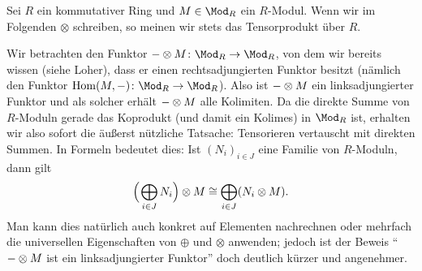 \begin{thBeispiel}
    \label{ch3:bsp:tensorvskolimiten}
    \newcommand{\tensorM}{\blank\otimes M}
    Sei $R$ ein kommutativer Ring und $M\in\Mod_R$ ein $R$-Modul. Wenn wir im
    Folgenden $\otimes$ schreiben, so meinen wir stets das Tensorprodukt über
    $R$. 
    
    \noindent
    Wir betrachten den Funktor $\tensorM\colon\Mod_R\to\Mod_R$, von dem wir
    bereits wissen (siehe Loher\cite[2.8]{talk:loher}), dass er einen
    rechtsadjungierten Funktor besitzt (nämlich den Funktor
    $\operatorname{Hom}(M,\blank)\colon \Mod_R\to\Mod_R$). Also ist $\tensorM$
    ein linksadjungierter Funktor und als solcher erhält $\tensorM$ alle
    Kolimiten. Da die direkte Summe von $R$-Moduln gerade das Koprodukt (und
    damit ein Kolimes) in $\Mod_R$ ist, erhalten wir also sofort die äußerst
    nützliche Tatsache: Tensorieren vertauscht mit direkten Summen.  In Formeln
    bedeutet dies: Ist $(N_i)_{i\in J}$ eine Familie von $R$-Moduln, dann gilt
    \[ \Bigl(\mkern2mu \bigoplus_{i\in J} N_i \Bigr)\otimes M
        \cong \bigoplus_{i\in J} (N_i\otimes M)
    . \]
    Man kann dies natürlich auch konkret auf Elementen nachrechnen oder mehrfach
    die universellen Eigenschaften von $\oplus$ und $\otimes$ anwenden; jedoch
    ist der Beweis \enquote{$\tensorM$ ist ein linksadjungierter Funktor} doch
    deutlich kürzer und angenehmer.
    

\end{thBeispiel}
